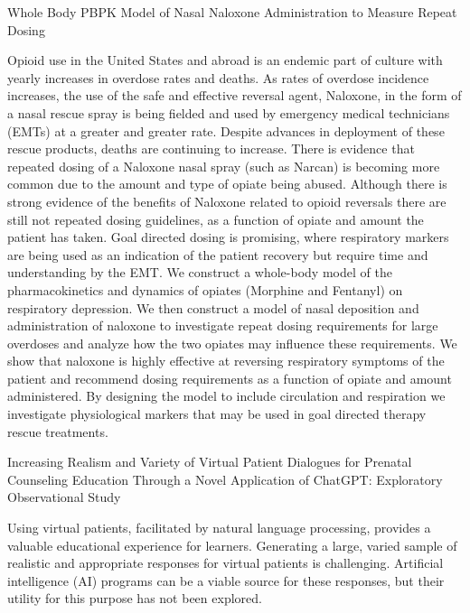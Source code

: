   \cventry
    {Whole Body PBPK Model of Nasal Naloxone Administration to Measure Repeat Dosing} %
    {} %
    {} %
    {} %
     {
    \begin{cvitems} %
    \item {Opioid use in the United States and abroad is an endemic part of culture with yearly increases in overdose rates and deaths. As rates of overdose incidence increases, the use of the safe and effective reversal agent, Naloxone, in the form of a nasal rescue spray is being fielded and used by emergency medical technicians (EMTs) at a greater and greater rate. Despite advances in deployment of these rescue products, deaths are continuing to increase. There is evidence that repeated dosing of a Naloxone nasal spray (such as Narcan) is becoming more common due to the amount and type of opiate being abused. Although there is strong evidence of the benefits of Naloxone related to opioid reversals there are still not repeated dosing guidelines, as a function of opiate and amount the patient has taken. Goal directed dosing is promising, where respiratory markers are being used as an indication of the patient recovery but require time and understanding by the EMT. We construct a whole-body model of the pharmacokinetics and dynamics of opiates (Morphine and Fentanyl) on respiratory depression. We then construct a model of nasal deposition and administration of naloxone to investigate repeat dosing requirements for large overdoses and analyze how the two opiates may influence these requirements. We show that naloxone is highly effective at reversing respiratory symptoms of the patient and recommend dosing requirements as a function of opiate and amount administered. By designing the model to include circulation and respiration we investigate physiological markers that may be used in goal directed therapy rescue treatments.}
    \end{cvitems}
     }

  \cventry
    {Increasing Realism and Variety of Virtual Patient Dialogues for Prenatal Counseling Education Through a Novel Application of ChatGPT: Exploratory Observational Study} %
    {} %
    {} %
    {} %
     {
    \begin{cvitems} %
    \item {Using virtual patients, facilitated by natural language processing, provides a valuable educational experience for learners. Generating a large, varied sample of realistic and appropriate responses for virtual patients is challenging. Artificial intelligence (AI) programs can be a viable source for these responses, but their utility for this purpose has not been explored.}
    \end{cvitems}
     }



